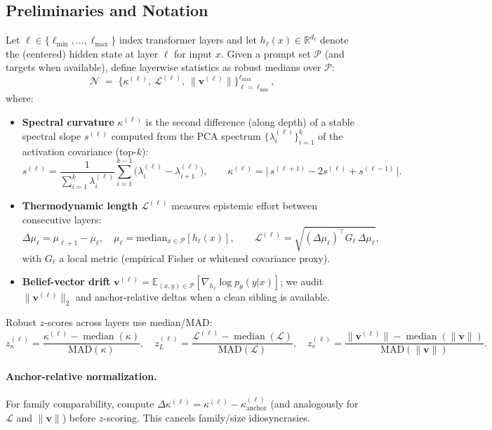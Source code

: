 \documentclass[11pt]{article}
\begin{document}
\subsection{Preliminaries and Notation}
Let $\ell\in\{\ell_{\min},\ldots,\ell_{\max}\}$ index transformer layers and let $h_\ell(x)\in\mathbb{R}^{d_\ell}$ denote the (centered) hidden state at layer $\ell$ for input $x$.
Given a prompt set $\mathcal{P}$ (and targets when available), define layerwise statistics as robust medians over $\mathcal{P}$:
\[
\mathcal{N}\;=\;\Big\{\kappa^{(\ell)},\ \mathcal{L}^{(\ell)},\ \|\mathbf{v}^{(\ell)}\|\Big\}_{\ell=\ell_{\min}}^{\ell_{\max}},
\]
where:
\begin{itemize}\setlength\itemsep{2pt}
\item \textbf{Spectral curvature} $\kappa^{(\ell)}$ is the second difference (along depth) of a stable spectral slope $s^{(\ell)}$ computed from the PCA spectrum $\{\lambda_i^{(\ell)}\}_{i=1}^k$ of the activation covariance (top-$k$):
\[
s^{(\ell)}=\frac{1}{\sum_{i=1}^k \lambda_i^{(\ell)}}\sum_{i=1}^{k-1}\!\big(\lambda_i^{(\ell)}-\lambda_{i+1}^{(\ell)}\big),
\qquad
\kappa^{(\ell)}=\big|\,s^{(\ell+1)}-2s^{(\ell)}+s^{(\ell-1)}\,\big|.
\]
\item \textbf{Thermodynamic length} $\mathcal{L}^{(\ell)}$ measures epistemic effort between consecutive layers:
\[
\Delta\mu_\ell=\mu_{\ell+1}-\mu_\ell,\quad \mu_\ell=\mathrm{median}_{x\in\mathcal{P}}[h_\ell(x)],
\qquad
\mathcal{L}^{(\ell)}=\sqrt{(\Delta\mu_\ell)^\top G_\ell\,\Delta\mu_\ell},
\]
with $G_\ell$ a local metric (empirical Fisher or whitened covariance proxy).
\item \textbf{Belief-vector drift} $\mathbf{v}^{(\ell)}=\mathbb{E}_{(x,y)\in\mathcal{P}}[\nabla_{h_\ell}\log p_\theta(y|x)]$; we audit $\|\mathbf{v}^{(\ell)}\|_2$ and anchor-relative deltas when a clean sibling is available.
\end{itemize}
Robust $z$-scores across layers use median/MAD:
\[
z_\kappa^{(\ell)}=\frac{\kappa^{(\ell)}-\operatorname{median}(\kappa)}{\mathrm{MAD}(\kappa)},\quad
z_L^{(\ell)}=\frac{\mathcal{L}^{(\ell)}-\operatorname{median}(\mathcal{L})}{\mathrm{MAD}(\mathcal{L})},\quad
z_v^{(\ell)}=\frac{\|\mathbf{v}^{(\ell)}\|-\operatorname{median}(\|\mathbf{v}\|)}{\mathrm{MAD}(\|\mathbf{v}\|)}.
\]

\paragraph{Anchor-relative normalization.}
For family comparability, compute $\Delta \kappa^{(\ell)}=\kappa^{(\ell)}-\kappa^{(\ell)}_{\text{anchor}}$ (and analogously for $\mathcal{L}$ and $\|\mathbf{v}\|$) before $z$-scoring. This cancels family/size idiosyncrasies.
\end{document}
